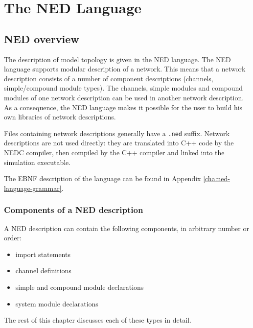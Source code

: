 \chapter{The NED Language}
\label{cha:the-ned-language}


\section{NED overview}

The description of model topology is given in the NED
language. The NED language supports modular
description of a network. This means that a network
description consists of a number of
component descriptions (channels,
simple/compound module
types). The channels, simple modules and compound
modules of one network description can be used in another network
description. As a consequence, the NED language makes it possible for
the user to build his own libraries of network descriptions.


Files containing network descriptions generally have a \texttt{.ned}
suffix.  Network descriptions are not used directly: they are
translated into C++ code by the NEDC compiler, then compiled by the
C++ compiler and linked into the simulation executable.


The EBNF description of the language can be found in Appendix
\ref{cha:ned-language-grammar}.





\subsection{Components of a NED description}

A NED description can contain the following components, in arbitrary 
number or order:
\begin{itemize}
  \item{import statements}
  \item{channel definitions}
  \item{simple and compound module declarations}
  \item{system module declarations}
\end{itemize}

The rest of this chapter discusses each of these types in detail.





